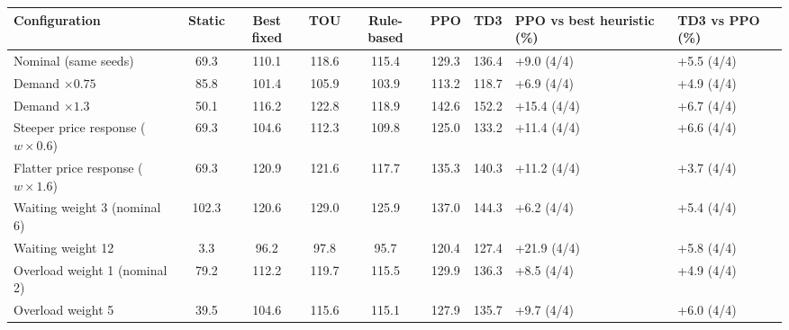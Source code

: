 \begin{tabular}{@{}lccccccll@{}}
\toprule
Configuration & Static & Best fixed & TOU & Rule-based & PPO & TD3 & PPO vs best heuristic (\%) & TD3 vs PPO (\%) \\
\midrule
Nominal (same seeds) & 69.3 & 110.1 & 118.6 & 115.4 & 129.3 & 136.4 & +9.0 (4/4) & +5.5 (4/4) \\
\midrule
Demand $\times 0.75$ & 85.8 & 101.4 & 105.9 & 103.9 & 113.2 & 118.7 & +6.9 (4/4) & +4.9 (4/4) \\
Demand $\times 1.3$ & 50.1 & 116.2 & 122.8 & 118.9 & 142.6 & 152.2 & +15.4 (4/4) & +6.7 (4/4) \\
Steeper price response ($w\times 0.6$) & 69.3 & 104.6 & 112.3 & 109.8 & 125.0 & 133.2 & +11.4 (4/4) & +6.6 (4/4) \\
Flatter price response ($w\times 1.6$) & 69.3 & 120.9 & 121.6 & 117.7 & 135.3 & 140.3 & +11.2 (4/4) & +3.7 (4/4) \\
Waiting weight 3 (nominal 6) & 102.3 & 120.6 & 129.0 & 125.9 & 137.0 & 144.3 & +6.2 (4/4) & +5.4 (4/4) \\
Waiting weight 12 & 3.3 & 96.2 & 97.8 & 95.7 & 120.4 & 127.4 & +21.9 (4/4) & +5.8 (4/4) \\
Overload weight 1 (nominal 2) & 79.2 & 112.2 & 119.7 & 115.5 & 129.9 & 136.3 & +8.5 (4/4) & +4.9 (4/4) \\
Overload weight 5 & 39.5 & 104.6 & 115.6 & 115.1 & 127.9 & 135.7 & +9.7 (4/4) & +6.0 (4/4) \\
\bottomrule
\end{tabular}